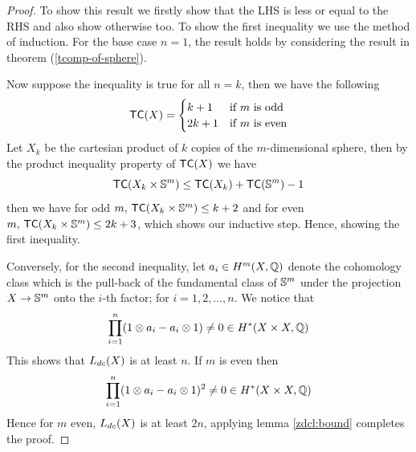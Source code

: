 \begin{proof}
    To show this result we firstly show that the LHS is less or equal to the RHS and also show otherwise too. To show the first inequality we use the method of induction. For the base case $n = 1$, the result holds by considering the result in theorem  (\ref{tcomp-of-sphere}).

    Now suppose the inequality is true for all $n = k$, then we have the following 
    \[
        \textsf{TC}(X) = \begin{cases}
            k + 1  & \text{if $m$ is odd}  \\
            2k + 1 & \text{if $m$ is even}
        \end{cases}
    \]
    Let $X_k$ be the cartesian product of $k$ copies of the $m$-dimensional sphere, then by the product inequality property of $\textsf{TC}(X)$ we have
    \[
        \textsf{TC}(X_k \times \mathbb{S}^m) \le \textsf{TC}(X_k) + \textsf{TC}(\mathbb{S}^m) - 1
    \]
    then we have for odd $m,\, \textsf{TC}(X_k \times \mathbb{S}^m) \le k +2$ and for even $m,\, \textsf{TC}(X_k \times \mathbb{S}^m) \le 2k +3$, which shows our inductive step. Hence, showing the first inequality.

    Conversely, for the second inequality, let $a_i \in H^m(X, \mathbb{Q})$ denote the cohomology class which is the pull-back of the fundamental class of $\mathbb{S}^m$ under the projection $X \rightarrow \mathbb{S}^m$ onto the $i$-th factor; for $i = 1, 2, \ldots, n$. We notice that 
    \[
        \prod_{i=1}^{n} (1 \otimes a_i - a_i \otimes 1) \neq 0 \in H^*(X \times X, \mathbb{Q})  
    \]
    This shows that $L_{dc}(X)$ is at least $n$. If $m$ is even then 
    \[
        \prod_{i=1}^{n} (1 \otimes a_i - a_i \otimes 1)^2 \neq 0 \in H^*(X \times X, \mathbb{Q})  
    \]
    Hence for $m$ even, $L_{dc}(X)$ is at least $2n$, applying lemma \ref{zdcl:bound} completes the proof.

\end{proof}

